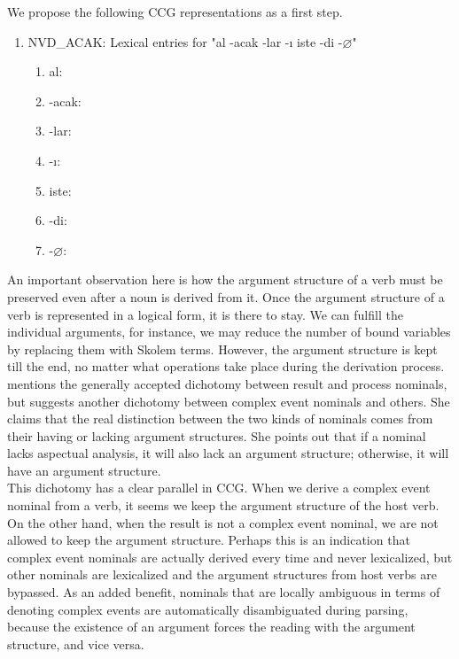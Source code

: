 \documentclass[11pt]{article} %
\begin{document}
We propose the following CCG representations as a first step. 

\begin{enumerate}[resume*]
	\item NVD\_ACAK: Lexical entries for "al -acak -lar -ı iste -di -$\varnothing$"
	\begin{enumerate}[label=(\alph*), ref=(\alph*)]\itemsep1pt
	\item al: 
	\item -acak: 
	\item -lar: 
	\item -ı: 
	\item iste: 
	\item -di: 
	\item -$\varnothing$: 
	\end{enumerate}
\end{enumerate}

An important observation here is how the argument structure of a verb must be preserved even after a noun is derived from it. Once the argument structure of a verb is represented in a logical form, it is there to stay. We can fulfill the individual arguments, for instance, we may reduce the number of bound variables by replacing them with Skolem terms. However, the argument structure is kept till the end, no matter what operations take place during the derivation process. \\

\cite{Grimshaw1990} mentions the generally accepted dichotomy between result and process nominals, but suggests another dichotomy between complex event nominals and others. She claims that the real distinction between the two kinds of nominals comes from their having or lacking argument structures. She points out that if a nominal lacks aspectual analysis, it will also lack an argument structure; otherwise, it will have an argument structure. \\

This dichotomy has a clear parallel in CCG. When we derive a complex event nominal from a verb, it seems we keep the argument structure of the host verb. On the other hand, when the result is not a complex event nominal, we are not allowed to keep the argument structure. Perhaps this is an indication that complex event nominals are actually derived every time and never lexicalized, but other nominals are lexicalized and the argument structures from host verbs are bypassed. As an added benefit, nominals that are locally ambiguous in terms of denoting complex events are automatically disambiguated during parsing, because the existence of an argument forces the reading with the argument structure, and vice versa. \\
\end{document}
